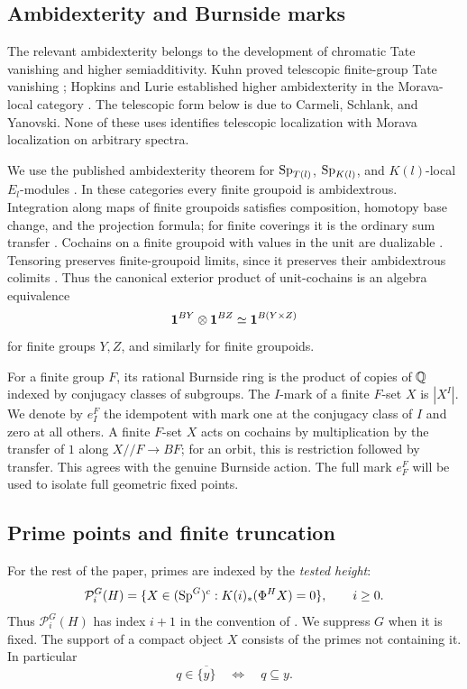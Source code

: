 \subsection{Ambidexterity and Burnside marks}

The relevant ambidexterity belongs to the development of chromatic
Tate vanishing and higher semiadditivity. Kuhn proved telescopic
finite-group Tate vanishing \cite[Theorem~1.5]{KuhnTate}; Hopkins
and Lurie established higher ambidexterity in the Morava-local
category \cite[Theorem~0.0.2]{HL}. The telescopic form below is due
to Carmeli, Schlank, and Yanovski. None of these uses identifies
telescopic localization with Morava localization on arbitrary spectra.

We use the published ambidexterity theorem for \(\mathrm{Sp}_{T(l)}\), \(\mathrm{Sp}_{K(l)}\), and \(K(l)\)-local \(E_l\)-modules \cite[Theorem~5.3.1 and Corollary~5.3.2]{CSY}. In these categories every finite groupoid is ambidextrous. Integration along maps of finite groupoids satisfies composition, homotopy base change, and the projection formula; for finite coverings it is the ordinary sum transfer \cite[Section~3.1]{CSY}. Cochains on a finite groupoid with values in the unit are dualizable \cite[Proposition~3.3.7]{CSY}. Tensoring preserves finite-groupoid limits, since it preserves their ambidextrous colimits \cite[Corollary~3.2.4]{CSY}. Thus the canonical exterior product of unit-cochains is an algebra equivalence
\[
 \mathbf1^{BY}\otimes\mathbf1^{BZ}\simeq\mathbf1^{B(Y\times Z)}
\]
for finite groups \(Y,Z\), and similarly for finite groupoids.

For a finite group \(F\), its rational Burnside ring is the product of copies of \(\mathbb Q\) indexed by conjugacy classes of subgroups. The \(I\)-mark of a finite \(F\)-set \(X\) is \(|X^I|\). We denote by \(e_I^F\) the idempotent with mark one at the conjugacy class of \(I\) and zero at all others. A finite \(F\)-set \(X\) acts on cochains by multiplication by the transfer of \(1\) along \(X\mathbin{//}F\to BF\); for an orbit, this is restriction followed by transfer. This agrees with the genuine Burnside action. The full mark \(e_F^F\) will be used to isolate full geometric fixed points.

\subsection{Prime points and finite truncation}

For the rest of the paper, primes are indexed by the \emph{tested height}:
\[
 \mathcal P_i^G(H)=
 \{X\in(\mathrm{Sp}^G)^c:K(i)_*(\Phi^H X)=0\},
 \qquad i\ge0.
\]
Thus \(\mathcal P_i^G(H)\) has index \(i+1\) in the convention of \cite{BS}. We suppress \(G\) when it is fixed. The support of a compact object \(X\) consists of the primes not containing it. In particular
\begin{equation}\label{eq:prime-closure}
 q\in\overline{\{y\}}\quad\Longleftrightarrow\quad q\subseteq y.
\end{equation}


